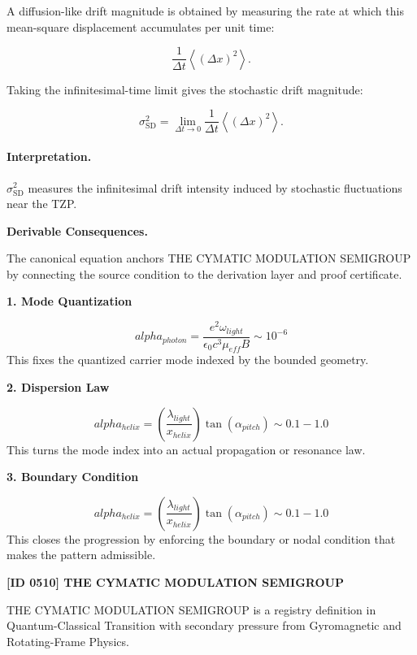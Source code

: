 A diffusion-like drift magnitude is obtained by measuring the rate at which this mean-square displacement accumulates per unit time:

\begin{equation}
\frac{1}{\Delta t}
\left\langle(\Delta x)^2\right\rangle .
\end{equation}

Taking the infinitesimal-time limit gives the stochastic drift magnitude:

\begin{equation}
\boxed{
\sigma_{\mathrm{SD}}^{2}
=
\lim_{\Delta t\to 0}
\frac{1}{\Delta t}
\left\langle
(\Delta x)^2
\right\rangle .
}
\end{equation}

\paragraph{Interpretation.}
$\sigma_{\mathrm{SD}}^{2}$ measures the infinitesimal drift intensity induced by stochastic fluctuations near the TZP.

\par\vspace{0.35em}
\noindent\textbf{Derivable Consequences.}\quad
\begingroup
\footnotesize
\raggedright
The canonical equation anchors THE CYMATIC MODULATION SEMIGROUP by connecting the source condition to the derivation layer and proof certificate.
\par\endgroup

\noindent\textbf{1. Mode Quantization}\par
\[
alpha_{photon} = \frac{e^2 \omega_{light}}{\epsilon_0 c^3 \mu_{eff} B} \sim 10^{-6}
\]
\noindent This fixes the quantized carrier mode indexed by the bounded geometry.\par
\noindent\textbf{2. Dispersion Law}\par
\[
alpha_{helix} = (\frac{\lambda_{light}}{x_{helix}}) \tan(\alpha_{pitch}) \sim 0.1 - 1.0
\]
\noindent This turns the mode index into an actual propagation or resonance law.\par
\noindent\textbf{3. Boundary Condition}\par
\[
alpha_{helix} = (\frac{\lambda_{light}}{x_{helix}}) \tan(\alpha_{pitch}) \sim 0.1 - 1.0
\]
\noindent This closes the progression by enforcing the boundary or nodal condition that makes the pattern admissible.\par

\clearpage
\noindent\textbf{[ID 0510] THE CYMATIC MODULATION SEMIGROUP}\par
\vspace{0.35em}
\begingroup\small
{}
THE CYMATIC MODULATION SEMIGROUP is a registry definition in Quantum-Classical Transition with secondary pressure from Gyromagnetic and Rotating-Frame Physics.

